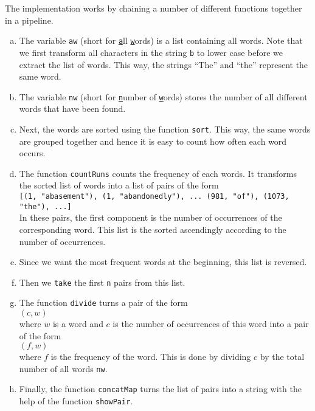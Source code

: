 \begin{enumerate}
      The implementation works by chaining a number of different functions together in a pipeline.
      \begin{enumerate}[(a)]
      \item The variable \texttt{aw} (short for \underline{\texttt{a}}ll \underline{\texttt{w}}ords) is a list
            containing all words.  Note that we first transform all characters in the string \texttt{b} to
            lower case before we extract the list of words.  This way, the strings ``The''  and ``the''
            represent the same word.
      \item The variable \texttt{nw}  (short for \underline{\texttt{n}}umber of \underline{\texttt{w}}ords)
            stores the number of all different words that have been found.
      \item Next, the words are sorted using the function \texttt{sort}.  This way, the same words are grouped
            together and hence it is easy to count how often each word occurs.
      \item The function \texttt{countRuns} counts the frequency of each words.  It transforms the sorted list
            of words into a list of pairs of the form
            \\[0.2cm]
            \hspace*{1.3cm}
            \texttt{[(1, "abasement"), (1, "abandonedly"), ... (981, "of"), (1073, "the"), ...]}
            \\[0.2cm]
            In these pairs, the first component is the number of occurrences of the corresponding word.
            This list is the sorted ascendingly according to the number of occurrences.  
      \item Since we want the most frequent words at the beginning, this list is reversed.
      \item Then we \texttt{take} the first \texttt{n} pairs from this list.
      \item The function \texttt{divide} turns a pair of the form
            \\[0.2cm]
            \hspace*{1.3cm}
            $(c, w)$
            \\[0.2cm]
            where $w$ is a word and $c$ is the number of occurrences of this word into a pair of the form
            \\[0.2cm]
            \hspace*{1.3cm}
            $(f, w)$
            \\[0.2cm]
            where $f$ is the frequency of the word.  This is done by dividing $c$ by the total number of all
            words \texttt{nw}.
      \item Finally, the function \texttt{concatMap} turns the list of pairs into a string with the help of the
            function \texttt{showPair}.
      \end{enumerate}      
\end{enumerate}

